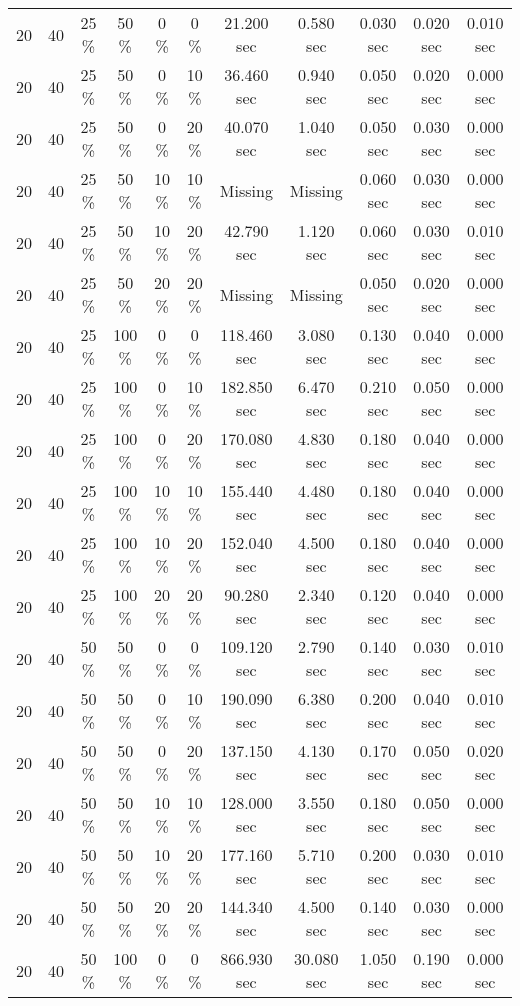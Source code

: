 \documentclass{article}
\begin{document}
\begin{longtable}[]{@{}ccccccccccc@{}}
20 & 40 & 25 \% & 50 \% & 0 \% & 0 \% & 21.200 sec & 0.580 sec & 0.030 sec & 0.020 sec & 0.010 sec \\
20 & 40 & 25 \% & 50 \% & 0 \% & 10 \% & 36.460 sec & 0.940 sec & 0.050 sec & 0.020 sec & 0.000 sec \\
20 & 40 & 25 \% & 50 \% & 0 \% & 20 \% & 40.070 sec & 1.040 sec & 0.050 sec & 0.030 sec & 0.000 sec \\
20 & 40 & 25 \% & 50 \% & 10 \% & 10 \% & Missing & Missing & 0.060 sec & 0.030 sec & 0.000 sec \\
20 & 40 & 25 \% & 50 \% & 10 \% & 20 \% & 42.790 sec & 1.120 sec & 0.060 sec & 0.030 sec & 0.010 sec \\
20 & 40 & 25 \% & 50 \% & 20 \% & 20 \% & Missing & Missing & 0.050 sec & 0.020 sec & 0.000 sec \\
20 & 40 & 25 \% & 100 \% & 0 \% & 0 \% & 118.460 sec & 3.080 sec & 0.130 sec & 0.040 sec & 0.000 sec \\
20 & 40 & 25 \% & 100 \% & 0 \% & 10 \% & 182.850 sec & 6.470 sec & 0.210 sec & 0.050 sec & 0.000 sec \\
20 & 40 & 25 \% & 100 \% & 0 \% & 20 \% & 170.080 sec & 4.830 sec & 0.180 sec & 0.040 sec & 0.000 sec \\
20 & 40 & 25 \% & 100 \% & 10 \% & 10 \% & 155.440 sec & 4.480 sec & 0.180 sec & 0.040 sec & 0.000 sec \\
20 & 40 & 25 \% & 100 \% & 10 \% & 20 \% & 152.040 sec & 4.500 sec & 0.180 sec & 0.040 sec & 0.000 sec \\
20 & 40 & 25 \% & 100 \% & 20 \% & 20 \% & 90.280 sec & 2.340 sec & 0.120 sec & 0.040 sec & 0.000 sec \\
20 & 40 & 50 \% & 50 \% & 0 \% & 0 \% & 109.120 sec & 2.790 sec & 0.140 sec & 0.030 sec & 0.010 sec \\
20 & 40 & 50 \% & 50 \% & 0 \% & 10 \% & 190.090 sec & 6.380 sec & 0.200 sec & 0.040 sec & 0.010 sec \\
20 & 40 & 50 \% & 50 \% & 0 \% & 20 \% & 137.150 sec & 4.130 sec & 0.170 sec & 0.050 sec & 0.020 sec \\
20 & 40 & 50 \% & 50 \% & 10 \% & 10 \% & 128.000 sec & 3.550 sec & 0.180 sec & 0.050 sec & 0.000 sec \\
20 & 40 & 50 \% & 50 \% & 10 \% & 20 \% & 177.160 sec & 5.710 sec & 0.200 sec & 0.030 sec & 0.010 sec \\
20 & 40 & 50 \% & 50 \% & 20 \% & 20 \% & 144.340 sec & 4.500 sec & 0.140 sec & 0.030 sec & 0.000 sec \\
20 & 40 & 50 \% & 100 \% & 0 \% & 0 \% & 866.930 sec & 30.080 sec & 1.050 sec & 0.190 sec & 0.000 sec \\

\end{longtable}
\end{document}
